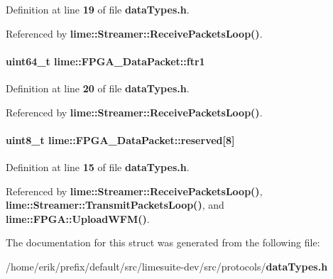 Definition at line {\bf 19} of file {\bf data\+Types.\+h}.



Referenced by {\bf lime\+::\+Streamer\+::\+Receive\+Packets\+Loop()}.

\paragraph[{ftr1}]{\setlength{\rightskip}{0pt plus 5cm}uint64\+\_\+t lime\+::\+F\+P\+G\+A\+\_\+\+Data\+Packet\+::ftr1}\label{structlime_1_1FPGA__DataPacket_a2c01536be458cdb42c99e45c767c330c}


Definition at line {\bf 20} of file {\bf data\+Types.\+h}.



Referenced by {\bf lime\+::\+Streamer\+::\+Receive\+Packets\+Loop()}.

\paragraph[{reserved}]{\setlength{\rightskip}{0pt plus 5cm}uint8\+\_\+t lime\+::\+F\+P\+G\+A\+\_\+\+Data\+Packet\+::reserved[8]}\label{structlime_1_1FPGA__DataPacket_a464b826e1201c770850e325cc255a6ac}


Definition at line {\bf 15} of file {\bf data\+Types.\+h}.



Referenced by {\bf lime\+::\+Streamer\+::\+Receive\+Packets\+Loop()}, {\bf lime\+::\+Streamer\+::\+Transmit\+Packets\+Loop()}, and {\bf lime\+::\+F\+P\+G\+A\+::\+Upload\+W\+F\+M()}.



The documentation for this struct was generated from the following file\+:\begin{DoxyCompactItemize}
\item 
/home/erik/prefix/default/src/limesuite-\/dev/src/protocols/{\bf data\+Types.\+h}\end{DoxyCompactItemize}
